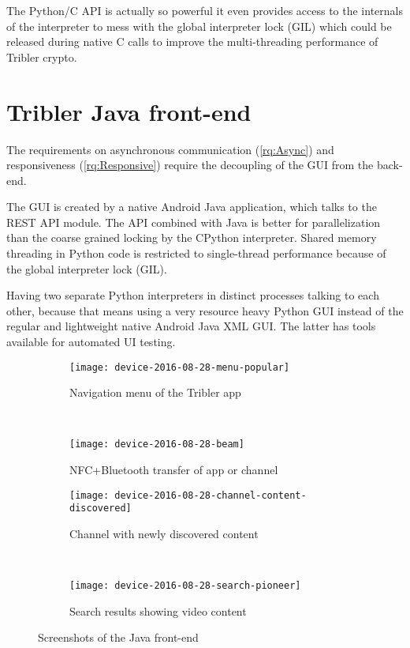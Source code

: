 The Python/C API is actually so powerful it even provides access to the internals of the interpreter to mess with the global interpreter lock (GIL) which could be released during native C calls to improve the multi-threading performance of Tribler crypto.


\section{Tribler Java front-end}
The requirements on asynchronous communication (\ref{rq:Async}) and responsiveness (\ref{rq:Responsive}) require the decoupling of the GUI from the back-end.

The GUI is created by a native Android Java application, which talks to the REST API module.
The API combined with Java is better for parallelization than the coarse grained locking by the CPython interpreter.
Shared memory threading in Python code is restricted to single-thread performance because of the global interpreter lock (GIL).

Having two separate Python interpreters in distinct processes talking to each other, because that means using a very resource heavy Python GUI instead of the regular and lightweight native Android Java XML GUI.
The latter has tools available for automated UI testing.

\begin{figure}[p]
	\centering
	\begin{subfigure}{.4\textwidth}
		\texttt{[image: device-2016-08-28-menu-popular]}
		\caption{Navigation menu of the Tribler app}
		\label{fig:menu-popular}
	\end{subfigure}
	~
	\begin{subfigure}{.4\textwidth}
		\texttt{[image: device-2016-08-28-beam]}
		\caption{NFC+Bluetooth transfer of app or channel}
		\label{fig:beam}
	\end{subfigure}
	
	\begin{subfigure}{.4\textwidth}
		\texttt{[image: device-2016-08-28-channel-content-discovered]}
		\caption{Channel with newly discovered content}
		\label{fig:channel-content-discovered}
	\end{subfigure}
	~
	\begin{subfigure}{.4\textwidth}
		\texttt{[image: device-2016-08-28-search-pioneer]}
		\caption{Search results showing video content}
		\label{fig:search-pioneer}
	\end{subfigure}
\caption{Screenshots of the Java front-end}
\end{figure}

